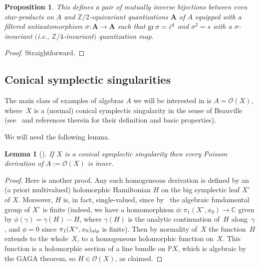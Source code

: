 \documentclass[11pt]{article}
\numberwithin{equation}{section}
\numberwithin{equation}{section}
\newtheorem{Lemma}[Theorem]{Lemma}
\newtheorem{Proposition}[Theorem]{Proposition}
\begin{document}
\begin{Proposition} This defines a pair of mutually inverse bijections between even star-products on $A$ and ${\mathbb Z}/2$-equivariant quantizations ${{\mathbf A}}$ of $A$ equipped with a filtered antiautomorphism $\sigma\colon {{\mathbf A}}\to {{\mathbf A}}$ such that $\operatorname{gr}\sigma={\rm i}^d$ and $\sigma^2=s$ with a $\sigma$-invariant $($i.e., ${\mathbb Z}/4$-invariant$)$ quantization map.
\end{Proposition}

\begin{proof} Straightforward.
\end{proof}

\setcounter{Theorem}{8}
\subsection{Conical symplectic singularities}

The main class of examples of algebras $A$ we will be interested in is $A={\mathcal O}(X)$, where~$X$ is a (normal) conical symplectic singularity in the sense of Beauville (see~\cite{Ka, L2} and references therein for their definition and basic properties).

We will need the following lemma.

\begin{Lemma}[{\cite[Proposition~2.5]{L2}}]\label{inn} If $X$ is a conical symplectic singularity then every Poisson derivation of $A:=\mathcal{O}(X)$ is inner.
\end{Lemma}

\begin{proof} Here is another proof. Any such homogeneous derivation is defined by an (a priori multivalued) holomorphic Hamiltonian $H$ on the big symplectic leaf $X^\circ$ of $X$. Moreover, $H$ is, in fact, single-valued, since by~\cite{Na1} the algebraic fundamental group of $X^\circ$ is finite (indeed, we have a homomorphism $\phi\colon \pi_1(X^\circ,x_0)\to {\mathbb C}$ given by $\phi(\gamma)=\gamma(H)-H$, where $\gamma(H)$ is the analytic continuation of~$H$ along~$\gamma$, and $\phi=0$ since $\pi_1(X^\circ,x_0)_{\rm alg}$ is finite). Then by normality of~$X$ the function~$H$ extends to the whole~$X$, to a homogeneous holomorphic function on~$X$. This function is a holomorphic section of a line bundle on ${\mathbb P}X$, which is algebraic by the GAGA theorem, so $H\in \mathcal{O}(X)$, as claimed.
\end{proof}
\end{document}
